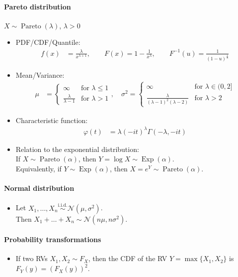\documentclass[a4paper,landscape,8pt,fleqn]{scrartcl}
\DeclareMathOperator{\Exp}{Exp}				%
\DeclareMathOperator{\Pareto}{Pareto}		%
\begin{document}
\begin{multicols*}{3}
\paragraph{Pareto distribution}
$X \sim \Pareto(\lambda)$, $\lambda > 0$
\begin{itemize}
\item PDF/CDF/Quantile:
\begin{align*}
f(x) &= \frac{\lambda}{x^{\lambda + 1}}, \qquad F(x) = 1-\frac{1}{x^\lambda}, \qquad F^{-1}(u) = \frac{1}{(1-u)^{\frac{1}{\lambda}}}
\end{align*}
\item Mean/Variance:
\begin{align*}
\mu &=
\begin{cases}
\infty &\text{for } \lambda \leq 1 \\
\frac{\lambda}{\lambda-1} &\text{for } \lambda > 1
\end{cases}
, \quad
\sigma^2 =
\begin{cases}
\infty &\text{for } \lambda \in (0,2] \\
\frac{\lambda}{(\lambda-1)^2(\lambda-2)} &\text{for } \lambda > 2
\end{cases}
\end{align*}
\item Characteristic function:
\begin{align*}
\varphi(t) &= \lambda(-i t)^\lambda \Gamma(-\lambda, -i t)
\end{align*}
\item Relation to the exponential distribution: \\
If $X \sim \Pareto(\alpha)$, then $Y = \log X \sim \Exp(\alpha)$. \\
Equivalently, if $Y \sim \Exp(\alpha)$, then $X = e^Y \sim \Pareto(\alpha)$.
\end{itemize}

\paragraph{Normal distribution}
\begin{itemize}
\item Let $X_1, \ldots, X_n \overset{\text{i.i.d.}}{\sim} \mathcal{N}(\mu, \sigma^2)$. \\
Then $X_1 + \ldots + X_n \sim \mathcal{N}(n \mu, n \sigma^2)$.
\end{itemize}

\paragraph{Probability transformations}
\begin{itemize}
\item If two RVs $X_1, X_2 \sim F_X$, then the CDF of the RV $Y = \max \lbrace X_1, X_2 \rbrace$ is $F_Y(y) = \left( F_X(y) \right)^2$.
\end{itemize}


\end{multicols*}
\end{document}
